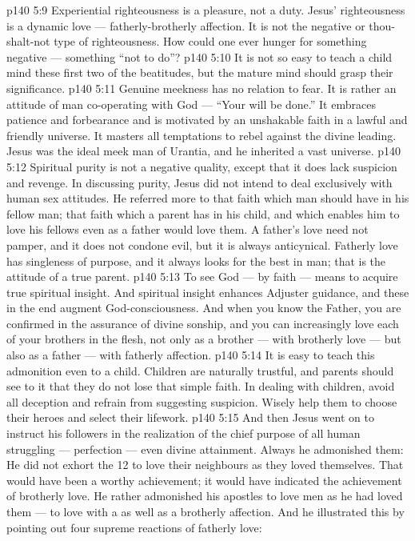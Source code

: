 \vs p140 5:9 Experiential righteousness is a pleasure, not a duty. Jesus’ righteousness is a dynamic love --- fatherly\hyp{}brotherly affection. It is not the negative or thou\hyp{}shalt\hyp{}not type of righteousness. How could one ever hunger for something negative --- something “not to do”?
\vs p140 5:10 \pc It is not so easy to teach a child mind these first two of the beatitudes, but the mature mind should grasp their significance.
\vs p140 5:11 \bibnobreakspace {} Genuine meekness has no relation to fear. It is rather an attitude of man co\hyp{}operating with God --- “Your will be done.” It embraces patience and forbearance and is motivated by an unshakable faith in a lawful and friendly universe. It masters all temptations to rebel against the divine leading. Jesus was the ideal meek man of Urantia, and he inherited a vast universe.
\vs p140 5:12 \bibnobreakspace {} Spiritual purity is not a negative quality, except that it does lack suspicion and revenge. In discussing purity, Jesus did not intend to deal exclusively with human sex attitudes. He referred more to that faith which man should have in his fellow man; that faith which a parent has in his child, and which enables him to love his fellows even as a father would love them. A father’s love need not pamper, and it does not condone evil, but it is always anticynical. Fatherly love has singleness of purpose, and it always looks for the best in man; that is the attitude of a true parent.
\vs p140 5:13 To see God --- by faith --- means to acquire true spiritual insight. And spiritual insight enhances Adjuster guidance, and these in the end augment God\hyp{}consciousness. And when you know the Father, you are confirmed in the assurance of divine sonship, and you can increasingly love each of your brothers in the flesh, not only as a brother --- with brotherly love --- but also as a father --- with fatherly affection.
\vs p140 5:14 It is easy to teach this admonition even to a child. Children are naturally trustful, and parents should see to it that they do not lose that simple faith. In dealing with children, avoid all deception and refrain from suggesting suspicion. Wisely help them to choose their heroes and select their lifework.
\vs p140 5:15 \pc And then Jesus went on to instruct his followers in the realization of the chief purpose of all human struggling --- perfection --- even divine attainment. Always he admonished them:  He did not exhort the 12 to love their neighbours as they loved themselves. That would have been a worthy achievement; it would have indicated the achievement of brotherly love. He rather admonished his apostles to love men as he had loved them --- to love with a  as well as a brotherly affection. And he illustrated this by pointing out four supreme reactions of fatherly love:
